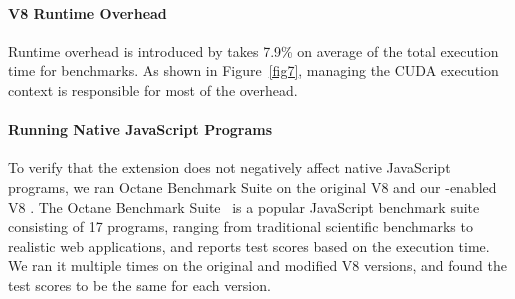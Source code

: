 \paragraph{V8 Runtime Overhead} Runtime overhead is introduced by \name
takes 7.9\% on average of the total execution time for \name
benchmarks. As shown in Figure~\ref{fig7}, managing the CUDA execution context is
responsible for most of the overhead.

\paragraph{Running Native JavaScript Programs} To verify that the \name
extension does not negatively affect native JavaScript programs, we ran Octane
Benchmark Suite on the original V8 and our \namens-enabled V8 . The Octane
Benchmark Suite~\cite{octane} is a popular JavaScript benchmark suite
consisting of 17 programs, ranging from traditional scientific benchmarks to
realistic web applications, and reports test scores based on the execution
time. We ran it multiple times on the original and modified V8 versions, and
found the test scores to be the same for each version. 


